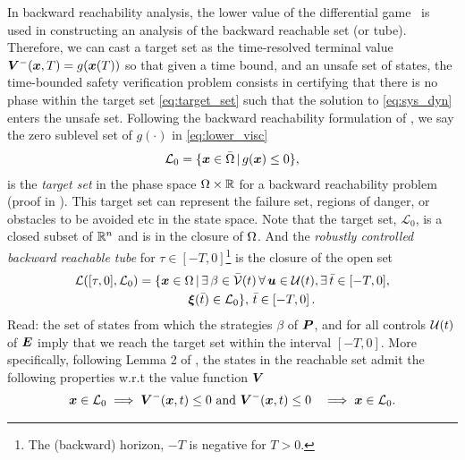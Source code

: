 In backward reachability analysis, the lower value of the differential game~\cite{Souganidis} is used in constructing an analysis of the backward reachable set (or tube). Therefore, we can cast a target set as the time-resolved terminal value $\bm{V}^-(\bm{x}, T) = g(\bm{x}(T))$ so that given a time bound, and an unsafe set of states, the time-bounded safety verification problem consists in certifying that there is no phase within the target set \eqref{eq:target_set} such that the solution to \eqref{eq:sys_dyn} enters the unsafe set. Following the backward reachability formulation of \cite{Mitchell2005}, we say the zero sublevel set of $g(\cdot)$ in \eqref{eq:lower_visc} \ie
%
\begin{align}
	\mathcal{L}_0 = \{ \bm{x} \in \bar{\Omega} \,|\, g(\bm{x}) \le 0 \},
	\label{eq:target_set}
\end{align}
%
is the \textit{target set} in the phase space $\Omega \times \mathbb{R}$ for a backward reachability problem (proof in \cite{Mitchell2005}). This target set can represent the failure set, regions of danger, or obstacles to be avoided etc in the state space. Note that the target set, $\mathcal{L}_0$, is a closed subset of $\mathbb{R}^n$ and is in the closure of $\Omega$. And the \textit{robustly controlled backward reachable tube} for $\tau \in [-T, 0]$\footnote{The (backward) horizon, $-T$ is negative for $T>0$.} is the closure of the open set
%
\begin{align}
	\mathcal{L}([\tau, 0], \mathcal{L}_0) &= \{\state \in \openset \,| \, \exists \, \beta \in \mathcal{\bar{V}}(t) \,  \forall \, \bm{u} \in \mathcal{U}(t), \exists \, \bar{t} \in [-T, 0], \nonumber \\
	& \qquad  \qquad \bm{\xi}(\bar{t})%
	\in  \mathcal{L}_0 \}, \,\bar{t} \in \left[-T, 0\right].
	\label{eq:rcbrt}
\end{align}
%
Read: the set of states from which the strategies $\beta$ of $\bm{P}$, and for all controls $\mathcal{U}(t)$ of $\bm{E}$ imply that we reach the target set within the interval $[-T, 0]$.   More specifically, following Lemma 2 of \cite{Mitchell2005}, the states in the reachable set admit the following properties w.r.t the value function $\bm{V}$
%
	\begin{align}
		\bm{x} \in \mathcal{L}_0 &\implies \bm{V}^-(\bm{x}, t) \le 0 \text{ and }		\bm{V}^-(\bm{x}, t) \le 0 &\implies \bm{x} \in \mathcal{L}_0.
	\end{align}
